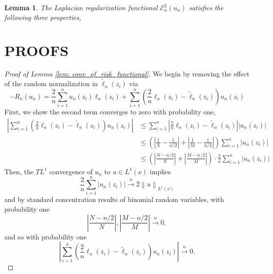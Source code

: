 \documentclass{article}
\newcommand{\norm}[1]{\left\lVert#1\right\rVert}
\newcommand{\abs}[1]{\left \lvert #1 \right \rvert}
\newcommand{\E}{\mathcal{E}}
\theoremstyle{alden}
\theoremstyle{aldenthm}
\newtheorem{lemma}{Lemma}
\theoremstyle{remark}
\begin{document}
\begin{lemma}
	\label{lem: gamma_convergence_of_energy_function}
	The Laplacian regularization functional $\E_n^2(u_n)$ satisfies the following three properties, 
\end{lemma}

\section{PROOFS}
\begin{proof}[Proof of Lemma \ref{lem: conv_of_risk_functional}]
	We begin by removing the effect of the random normalization in $\widetilde{\ell}_n(z_i)$ via
	\begin{equation*}
	- R_n(u_n) = \frac{2}{n} \sum_{i = 1}^{n} u_n(z_i) \ell_n(z_i) + \sum_{i = 1}^{n} \left(\frac{2}{n} \ell_n(z_i) - \widetilde{\ell}_n(z_i) \right)u_n(z_i)
	\end{equation*}
	First, we show the second term converges to zero with probability one,
	\begin{align*}
	\abs{\sum_{i = 1}^{n} \left(\frac{2}{n} \ell_n(z_i) - \widetilde{\ell}_n(z_i) \right)u_n(z_i)} & \leq \sum_{i = 1}^{n} \abs{\frac{2}{n} \ell_n(z_i) - \widetilde{\ell}_n(z_i)} \abs{u_n(z_i)} \\
	& \leq \left(\abs{\frac{1}{N} - \frac{1}{n/2}} + \abs{\frac{1}{M} - \frac{1}{n/2}}\right) \sum_{i = 1}^{n} \abs{u_n(z_i)} \\
	& \leq \left(\abs{\frac{N - n/2}{N}} + \abs{\frac{M - n/2}{M}}\right) \cdot \frac{2}{n} \sum_{i = 1}^{n}\abs{u_n(z_i)}
	\end{align*}
	Then, the $TL^1$ convergence of $u_n$ to $u \in L^1(\nu)$ implies
	\begin{equation*}
	\frac{2}{n} \sum_{i = 1}^{n}\abs{u_n(z_i)} \overset{n}{\to} 2 \norm{u}_{L^1(\nu)}
	\end{equation*}
	and by standard concentration results of binomial random variables, with probability one
	\begin{equation*}
	\abs{\frac{N - n/2}{N}}, \abs{\frac{M - n/2}{M}} \overset{n}{\to} 0,
	\end{equation*}
	and so with probability one
	\begin{equation*}
	\abs{\sum_{i = 1}^{n} \left(\frac{2}{n} \ell_n(z_i) - \widetilde{\ell}_n(z_i) \right)u_n(z_i)} \overset{n}{\to} 0.
	\end{equation*}
	

\end{proof}
\end{document}
